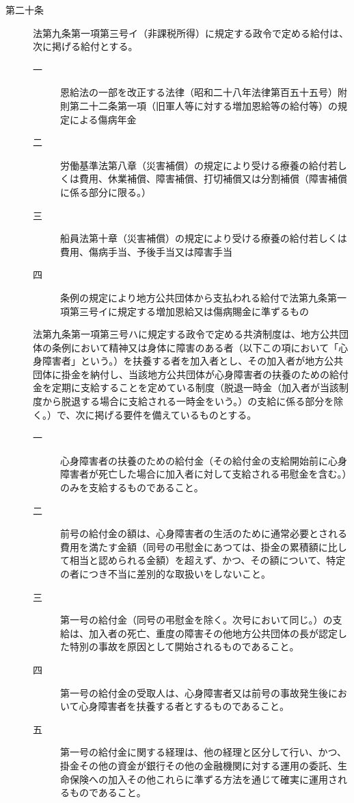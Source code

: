 \documentclass[twocolumn,a4j,10pt]{ltjtarticle}
\begin{document}
\begin{description}
\item[第二十条]法第九条第一項第三号イ（非課税所得）に規定する政令で定める給付は、次に掲げる給付とする。
\begin{description}
\item[一]恩給法の一部を改正する法律（昭和二十八年法律第百五十五号）附則第二十二条第一項（旧軍人等に対する増加恩給等の給付等）の規定による傷病年金
\item[二]労働基準法第八章（災害補償）の規定により受ける療養の給付若しくは費用、休業補償、障害補償、打切補償又は分割補償（障害補償に係る部分に限る。）
\item[三]船員法第十章（災害補償）の規定により受ける療養の給付若しくは費用、傷病手当、予後手当又は障害手当
\item[四]条例の規定により地方公共団体から支払われる給付で法第九条第一項第三号イに規定する増加恩給又は傷病賜金に準ずるもの
\end{description}
\item[]法第九条第一項第三号ハに規定する政令で定める共済制度は、地方公共団体の条例において精神又は身体に障害のある者（以下この項において「心身障害者」という。）を扶養する者を加入者とし、その加入者が地方公共団体に掛金を納付し、当該地方公共団体が心身障害者の扶養のための給付金を定期に支給することを定めている制度（脱退一時金（加入者が当該制度から脱退する場合に支給される一時金をいう。）の支給に係る部分を除く。）で、次に掲げる要件を備えているものとする。
\begin{description}
\item[一]心身障害者の扶養のための給付金（その給付金の支給開始前に心身障害者が死亡した場合に加入者に対して支給される弔慰金を含む。）のみを支給するものであること。
\item[二]前号の給付金の額は、心身障害者の生活のために通常必要とされる費用を満たす金額（同号の弔慰金にあつては、掛金の累積額に比して相当と認められる金額）を超えず、かつ、その額について、特定の者につき不当に差別的な取扱いをしないこと。
\item[三]第一号の給付金（同号の弔慰金を除く。次号において同じ。）の支給は、加入者の死亡、重度の障害その他地方公共団体の長が認定した特別の事故を原因として開始されるものであること。
\item[四]第一号の給付金の受取人は、心身障害者又は前号の事故発生後において心身障害者を扶養する者とするものであること。
\item[五]第一号の給付金に関する経理は、他の経理と区分して行い、かつ、掛金その他の資金が銀行その他の金融機関に対する運用の委託、生命保険への加入その他これらに準ずる方法を通じて確実に運用されるものであること。
\end{description}
\end{description}
\end{document}
